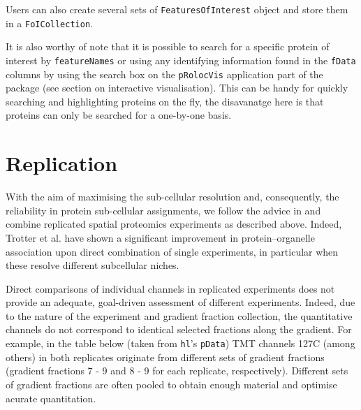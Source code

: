 Users can also create several sets of \texttt{FeaturesOfInterest}
object and store them in a \texttt{FoICollection}.

It is also worthy of note that it is possible to search for a
specific protein of interest by \texttt{featureNames} or using any
identifying information found in the \texttt{fData} columns by using
the search box on the \texttt{pRolocVis} application part of the
 package (see section on interactive
visualisation). This can be handy for quickly searching and
highlighting proteins on the fly, the disavanatge here is that
proteins can only be searched for a one-by-one basis.

\section*{Replication}

With the aim of maximising the sub-cellular resolution and,
consequently, the reliability in protein sub-cellular assignments, we
follow the advice in \cite{Trotter:2010} and combine replicated spatial
proteomics experiments as described above. Indeed, Trotter et
al. have shown a significant improvement in protein–organelle
association upon direct combination of single experiments, in
particular when these resolve different subcellular niches.

Direct comparisons of individual channels in replicated experiments
does not provide an adequate, goal-driven assessment of different
experiments. Indeed, due to the nature of the experiment and gradient
fraction collection, the quantitative channels do not correspond to
identical selected fractions along the gradient. For example, in the
table below (taken from \texttt{hl}'s \texttt{pData}) TMT channels
127C (among others) in both replicates originate from different sets
of gradient fractions (gradient fractions 7 - 9 and 8 - 9 for each
replicate, respectively). Different sets of gradient fractions are
often pooled to obtain enough material and optimise acurate
quantitation.

